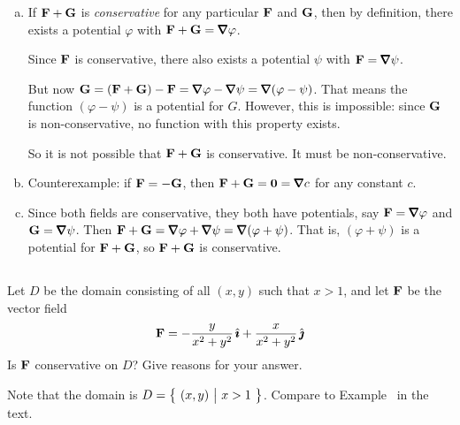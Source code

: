 \begin{solution}
\begin{enumerate}[a.]
\item If $\mathbf{F}+\mathbf{G}$ is \emph{conservative} for any particular $\mathbf{F}$ and $\mathbf{G}$, then by definition, there exists a potential $\varphi$ with $\vF+\vG = \vnabla \varphi$. 

Since $\mathbf{F}$ is conservative, there also exists a potential $\psi$ with $\vF = \vnabla \psi$.

But now $\vG = (\vF+\vG)-\vF=\vnabla \varphi - \vnabla \psi = \vnabla(\varphi-\psi)$. That means the function $(\varphi-\psi)$ is a potential for $G$. However, this is impossible: since $\mathbf{G}$ is non-conservative, no function with this property exists.

So it is not possible that $\mathbf{F}+\mathbf{G}$ is conservative. It must be non-conservative.
\item Counterexample: if $\mathbf{F} = -\mathbf{G}$, then $\vF+\vG = \mathbf 0 = \vnabla c$ for any constant $c$.
\item Since both fields are conservative, they both have potentials, say $\vF=\vnabla \varphi$ and $\vG = \vnabla \psi$. Then $\vF+\vG = \vnabla\varphi+\vnabla\psi=\vnabla(\varphi+\psi)$. That is, $(\varphi+\psi)$ is a potential for $\mathbf{F}+\mathbf{G}$, so $\mathbf{F}+\mathbf{G}$ is conservative.

\end{enumerate}
\end{solution}

\subsection*{\Procedural}


\begin{question}[M317 2006A] %
Let $D$ be the domain consisting of all $(x,y)$ such that $x>1$,
and let $\mathbf{F}$ be the vector field
\begin{align*}
\mathbf{F} =  -\frac{y}{x^2+y^2}\,\hat{\pmb{\imath}} + \frac{x}{x^2+y^2}\,\hat{\pmb{\jmath}}
\end{align*}
Is $\mathbf{F}$ conservative on $D$? Give reasons for your answer.

\end{question}

\begin{hint} 
Note that the domain is $D=\big\{ \ (x,y)\ \big|\ x>1\ \big\}$. Compare to Example~ in the text.
\end{hint}

